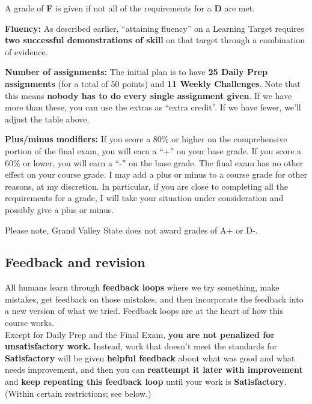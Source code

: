 \documentclass[]{article}
\begin{document}
A grade of \textbf{F} is given if not all of the requirements for a \textbf{D} are met. 

\textbf{Fluency:} As described earlier, ``attaining fluency'' on a Learning Target requires \textbf{two successful demonstrations of skill} on that target through a combination of evidence. 

\textbf{Number of assignments:} The initial plan is to have \textbf{25 Daily Prep assignments }(for a total of 50 points) and \textbf{11 Weekly Challenges}. Note that this means \textbf{nobody has to do every single assignment given}. If we have more than these, you can use the extras as ``extra credit''. If we have fewer, we'll adjust the table above.

\textbf{Plus/minus modifiers:} If you score a 80\% or higher on the comprehensive portion of the final exam, you will earn a ``+'' on your base grade. If you score a 60\% or lower, you will earn a ``-'' on the base grade. The final exam has no other effect on your course grade. I may add a plus or minus to a course grade for other reasons, at my discretion. In particular, if you are close to completing all the requirements for a grade, I will take your situation under consideration and possibly give a plus or minus. 

Please note, Grand Valley State does not award grades of A+ or D-. 



\subsection{Feedback and revision}

\begin{tcolorbox}[title=Feedback loops in MTH 225, colback=yellow!15!white]
All humans learn through \textbf{feedback loops} where we try something, make mistakes, get feedback on those mistakes, and then incorporate the feedback into a new version of what we tried. Feedback loops are at the heart of how this course works. \\

Except for Daily Prep and the Final Exam, \textbf{you are not penalized for unsatisfactory work.} Instead, work that doesn't meet the standards for \textbf{Satisfactory} will be given \textbf{helpful feedback} about what was good and what needs improvement, and then you can \textbf{reattempt it later with improvement} and \textbf{keep repeating this feedback loop} until your work is \textbf{Satisfactory}. (Within certain restrictions; see below.) 
\end{tcolorbox}
\end{document}
